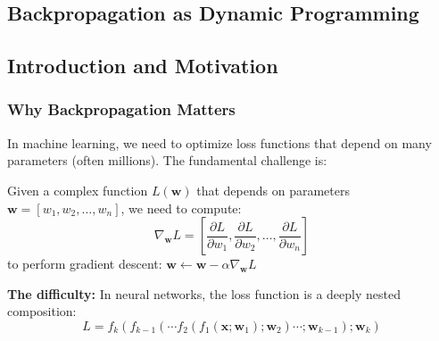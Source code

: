 \begin{notechapter}
\chapter{Backpropagation as Dynamic Programming}\label{ch:backprop-dynamic-programming}

\begin{abstract}
This document provides a clear, example-driven explanation of the backpropagation
algorithm as a dynamic programming method for computing gradients in computational graphs.
We demystify the notation, present the algorithm in both scalar and vector forms,
and show how this fundamental technique enables modern machine learning.
\end{abstract}

\section{Introduction and Motivation}

\subsection{Why Backpropagation Matters}

In machine learning, we need to optimize loss functions that depend on many parameters (often millions).
The fundamental challenge is:

\begin{tcolorbox}[colback=examplecolor,colframe=nodecolor,title=The Core Problem]
Given a complex function $L(\mathbf{w})$ that depends on parameters $\mathbf{w} = [w_1, w_2, \ldots, w_n]$,
we need to compute:
$$\nabla_{\mathbf{w}} L = \left[\frac{\partial L}{\partial w_1},
\frac{\partial L}{\partial w_2}, \ldots, \frac{\partial L}{\partial w_n}\right]$$
to perform gradient descent: $\mathbf{w} \leftarrow \mathbf{w} - \alpha \nabla_{\mathbf{w}} L$
\end{tcolorbox}

\textbf{The difficulty:} In neural networks, the loss function is a deeply nested composition:
$$L = f_k(f_{k-1}(\cdots f_2(f_1(\mathbf{x}; \mathbf{w}_1); \mathbf{w}_2) \cdots; \mathbf{w}_{k-1}); \mathbf{w}_k)$$


\end{notechapter}
